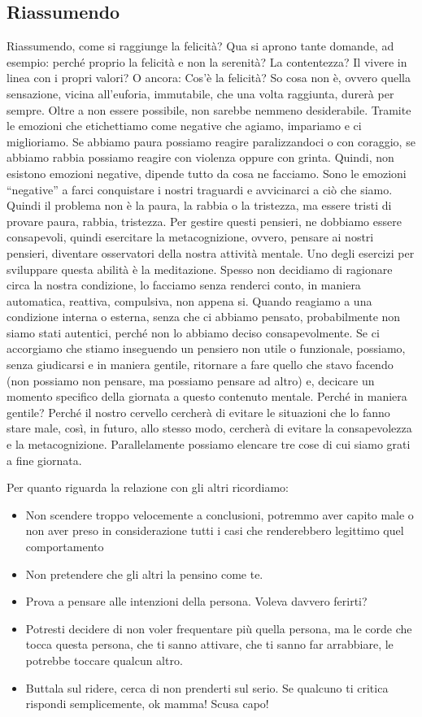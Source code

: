 \documentclass[12pt]{book} %
\begin{document}
\subsection{Riassumendo}
Riassumendo, come si raggiunge la felicità? Qua si aprono tante domande, ad esempio: perché proprio la felicità e non la
serenità? La contentezza? Il vivere in linea con i propri valori? O ancora: Cos'è la felicità? So
cosa non è, ovvero quella sensazione, vicina all'euforia, immutabile, che una volta raggiunta,
durerà per sempre. Oltre a non essere possibile, non sarebbe nemmeno desiderabile. Tramite le
emozioni che etichettiamo come negative che agiamo, impariamo e ci miglioriamo. Se abbiamo paura possiamo reagire
paralizzandoci o con coraggio, se abbiamo rabbia possiamo reagire con violenza oppure con grinta. Quindi, non esistono
emozioni negative, dipende tutto da cosa ne facciamo. Sono le emozioni
“negative” a farci conquistare i nostri traguardi e avvicinarci a ciò che siamo. Quindi il problema non è la paura,
la rabbia o la tristezza, ma essere tristi di provare paura, rabbia, tristezza. 
Per gestire questi pensieri, ne dobbiamo essere 
consapevoli, quindi esercitare la metacognizione, ovvero, pensare ai nostri pensieri, diventare osservatori della
nostra attività mentale. Uno degli esercizi per sviluppare questa abilità è la meditazione. Spesso non decidiamo di
ragionare circa la nostra condizione, lo facciamo senza renderci conto, in maniera automatica, reattiva, compulsiva, non appena si. 
Quando reagiamo a una condizione interna o esterna, senza che ci
abbiamo pensato, probabilmente non siamo stati autentici, perché non lo abbiamo deciso consapevolmente. 
Se ci accorgiamo che stiamo inseguendo un pensiero non utile o funzionale, possiamo, senza giudicarsi e in maniera gentile, ritornare a fare quello che
stavo facendo (non possiamo non pensare, ma possiamo pensare ad altro) e, decicare un momento specifico della giornata a questo contenuto mentale. 
Perché in maniera gentile? Perché il nostro cervello cercherà di evitare le situazioni che lo fanno
stare male, così, in futuro, allo stesso modo, cercherà di evitare la consapevolezza e la metacognizione. 
Parallelamente possiamo elencare tre cose di cui siamo grati a fine giornata.

Per quanto riguarda la relazione con gli altri ricordiamo:
\begin{itemize}
\item Non scendere troppo velocemente a conclusioni, potremmo aver capito male o non aver preso in considerazione tutti
i casi che renderebbero legittimo quel comportamento
\item Non pretendere che gli altri la pensino come te.
\item Prova a pensare alle intenzioni della persona. Voleva davvero ferirti?
\item Potresti decidere di non voler frequentare più quella persona, ma le corde che tocca questa persona,
che ti sanno attivare, che ti sanno far arrabbiare, le potrebbe toccare qualcun altro.
\item Buttala sul ridere, cerca di non prenderti sul serio. Se qualcuno ti critica rispondi semplicemente, ok mamma! Scusa capo!
\end{itemize}
\end{document}
